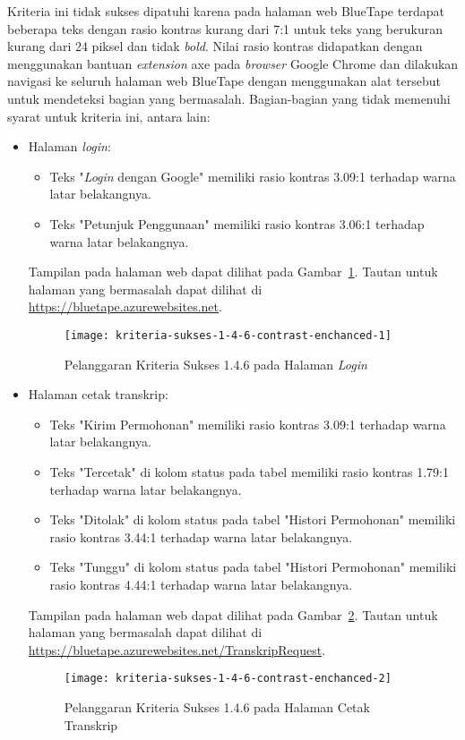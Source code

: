 Kriteria ini tidak sukses dipatuhi karena pada halaman web BlueTape terdapat beberapa teks dengan rasio kontras kurang dari 7:1 untuk teks yang berukuran kurang dari 24 piksel dan tidak \textit{bold}. Nilai rasio kontras didapatkan dengan menggunakan bantuan \textit{extension} axe pada \textit{browser} Google Chrome dan dilakukan navigasi ke seluruh halaman web BlueTape dengan menggunakan alat tersebut untuk mendeteksi bagian yang bermasalah. Bagian-bagian yang tidak memenuhi syarat untuk kriteria ini, antara lain:

\begin{itemize}
    \item Halaman \textit{login}: 
    \begin{itemize}
        \item Teks "\textit{Login} dengan Google" memiliki rasio kontras 3.09:1 terhadap warna latar belakangnya.
        \item Teks "Petunjuk Penggunaan" memiliki rasio kontras 3.06:1 terhadap warna latar belakangnya.
    \end{itemize}
    Tampilan pada halaman web dapat dilihat pada \mbox{Gambar \ref{fig:1.4.6_contrast_enchanced_1}}. Tautan untuk halaman yang bermasalah dapat dilihat di \url{https://bluetape.azurewebsites.net}.
    \begin{figure}[H]
        \centering  
        \texttt{[image: kriteria-sukses-1-4-6-contrast-enchanced-1]}  
        \caption[Pelanggaran Kriteria Sukses 1.4.6 pada Halaman \textit{Login}]{Pelanggaran Kriteria Sukses 1.4.6 pada Halaman \textit{Login}}
        \label{fig:1.4.6_contrast_enchanced_1}  
    \end{figure} 

    \item Halaman cetak transkrip: 
    \begin{itemize}
        \item Teks "Kirim Permohonan" memiliki rasio kontras 3.09:1 terhadap warna latar belakangnya.
        \item Teks "Tercetak" di kolom status pada tabel memiliki rasio kontras 1.79:1 terhadap warna latar belakangnya.
        \item Teks "Ditolak" di kolom status pada tabel "Histori Permohonan" memiliki rasio kontras 3.44:1 terhadap warna latar belakangnya.
        \item Teks "Tunggu" di kolom status pada tabel "Histori Permohonan" memiliki rasio kontras 4.44:1 terhadap warna latar belakangnya.
    \end{itemize}
    Tampilan pada halaman web dapat dilihat pada \mbox{Gambar \ref{fig:1.4.6_contrast_enchanced_2}}. Tautan untuk halaman yang bermasalah dapat dilihat di \url{https://bluetape.azurewebsites.net/TranskripRequest}.
    \begin{figure}[H]
        \centering  
        \texttt{[image: kriteria-sukses-1-4-6-contrast-enchanced-2]}  
        \caption[Pelanggaran Kriteria Sukses 1.4.6 pada Halaman Cetak Transkrip]{Pelanggaran Kriteria Sukses 1.4.6 pada Halaman Cetak Transkrip}
        \label{fig:1.4.6_contrast_enchanced_2}  
    \end{figure} 
    

\end{itemize}
